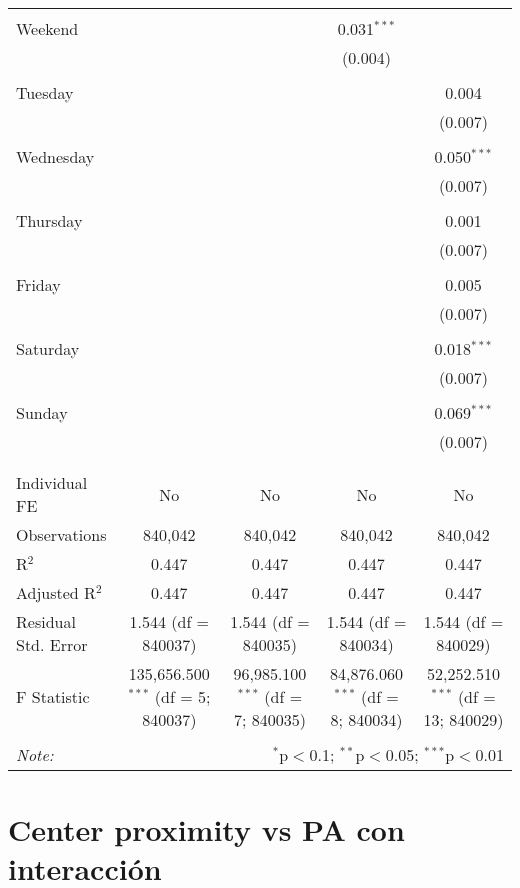 \documentclass[
]{article}
\begin{document}
\begin{table}[!htbp]
{\begin{tabular}{@{\extracolsep{5pt}}lcccc}
  & & & & \\ 
 Weekend &  &  & 0.031$^{***}$ &  \\ 
  &  &  & (0.004) &  \\ 
  & & & & \\ 
 Tuesday &  &  &  & 0.004 \\ 
  &  &  &  & (0.007) \\ 
  & & & & \\ 
 Wednesday &  &  &  & 0.050$^{***}$ \\ 
  &  &  &  & (0.007) \\ 
  & & & & \\ 
 Thursday &  &  &  & 0.001 \\ 
  &  &  &  & (0.007) \\ 
  & & & & \\ 
 Friday &  &  &  & 0.005 \\ 
  &  &  &  & (0.007) \\ 
  & & & & \\ 
 Saturday &  &  &  & 0.018$^{***}$ \\ 
  &  &  &  & (0.007) \\ 
  & & & & \\ 
 Sunday &  &  &  & 0.069$^{***}$ \\ 
  &  &  &  & (0.007) \\ 
  & & & & \\ 
\hline \\[-1.8ex] 
Individual FE & No & No & No & No \\ 
Observations & 840,042 & 840,042 & 840,042 & 840,042 \\ 
R$^{2}$ & 0.447 & 0.447 & 0.447 & 0.447 \\ 
Adjusted R$^{2}$ & 0.447 & 0.447 & 0.447 & 0.447 \\ 
Residual Std. Error & 1.544 (df = 840037) & 1.544 (df = 840035) & 1.544 (df = 840034) & 1.544 (df = 840029) \\ 
F Statistic & 135,656.500$^{***}$ (df = 5; 840037) & 96,985.100$^{***}$ (df = 7; 840035) & 84,876.060$^{***}$ (df = 8; 840034) & 52,252.510$^{***}$ (df = 13; 840029) \\ 
\hline 
\hline \\[-1.8ex] 
\textit{Note:}  & \multicolumn{4}{r}{$^{*}$p$<$0.1; $^{**}$p$<$0.05; $^{***}$p$<$0.01} \\ 
\end{tabular}
} 
\end{table} 
\newpage
\section{Center proximity vs PA con interacción}
\end{document}
